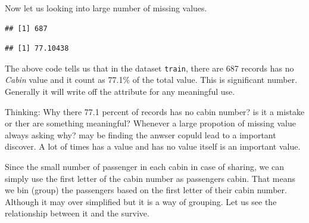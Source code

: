 \documentclass[
]{book}
\newenvironment{Shaded}{\begin{snugshade}}{\end{snugshade}}
\newcommand{\CommentTok}[1]{\textcolor[rgb]{0.56,0.35,0.01}{\textit{#1}}}
\newcommand{\DecValTok}[1]{\textcolor[rgb]{0.00,0.00,0.81}{#1}}
\newcommand{\KeywordTok}[1]{\textcolor[rgb]{0.13,0.29,0.53}{\textbf{#1}}}
\newcommand{\NormalTok}[1]{#1}
\newcommand{\OperatorTok}[1]{\textcolor[rgb]{0.81,0.36,0.00}{\textbf{#1}}}
\newcommand{\StringTok}[1]{\textcolor[rgb]{0.31,0.60,0.02}{#1}}
\begin{document}
Now let us looking into large number of missing values.

\begin{Shaded}
\end{Shaded}

\begin{verbatim}
## [1] 687
\end{verbatim}

\begin{Shaded}
\end{Shaded}

\begin{verbatim}
## [1] 77.10438
\end{verbatim}

The above code tells us that in the dataset \texttt{train}, there are 687 records has no \emph{Cabin} value and it count as 77.1\% of the total value. This is significant number. Generally it will write off the attribute for any meaningful use.

\begin{rmdthinking}
Thinking:
Why there 77.1 percent of records has no cabin number? is it a mistake or ther are something meaningful? Whenever a large propotion of missing value always asking why? may be finding the anwser copuld lead to a important discover. A lot of times has a value and has no value itself is an important value.
\end{rmdthinking}

Since the small number of passenger in each cabin in case of sharing, we can simply use the first letter of the cabin number as passengers cabin. That means we bin (group) the passengers based on the first letter of their cabin number. Although it may over simplified but it is a way of grouping. Let us see the relationship between it and the survive.
\end{document}
